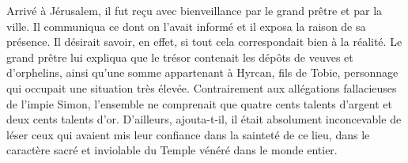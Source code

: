 Arrivé à Jérusalem, il fut reçu avec bienveillance par le grand prêtre et par la ville.
Il communiqua ce dont on l’avait informé et il exposa la raison de sa présence.
Il désirait savoir, en effet, si tout cela correspondait bien à la réalité.
Le grand prêtre lui expliqua que le trésor contenait les dépôts de veuves et d’orphelins,
	ainsi qu’une somme appartenant à Hyrcan, fils de Tobie,
	personnage qui occupait une situation très élevée.
Contrairement aux allégations fallacieuses de l’impie Simon,
	l’ensemble ne comprenait que quatre cents talents d’argent et deux cents talents d’or.
D’ailleurs, ajouta-t-il, il était absolument inconcevable
		de léser ceux qui avaient mis leur confiance dans la sainteté de ce lieu,
	dans le caractère sacré et inviolable du Temple vénéré dans le monde entier.
